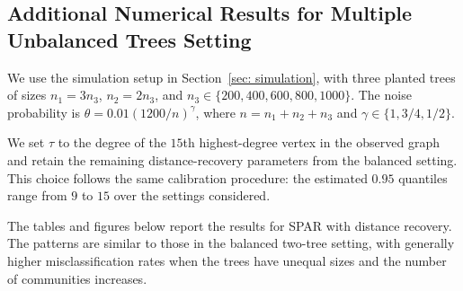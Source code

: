 \documentclass[twoside,11pt]{article}
\theoremstyle{remark}
\begin{document}
\subsection{Additional Numerical Results for Multiple Unbalanced Trees Setting}
\label{sec: additional simulation}
We use the simulation setup in Section~\ref{sec: simulation}, with three planted trees of sizes $n_1=3n_3$, $n_2=2n_3$, and $n_3\in\{200,400,600,800,1000\}$. The noise probability is $\theta=0.01(1200/n)^\gamma$, where $n=n_1+n_2+n_3$ and $\gamma\in\{1,3/4,1/2\}$.

We set $\tau$ to the degree of the $15$th highest-degree vertex in the observed graph and retain the remaining distance-recovery parameters from the balanced setting. This choice follows the same calibration procedure: the estimated $0.95$ quantiles range from $9$ to $15$ over the settings considered.

The tables and figures below report the results for SPAR with distance recovery. The patterns are similar to those in the balanced two-tree setting, with generally higher misclassification rates when the trees have unequal sizes and the number of communities increases.
\end{document}
